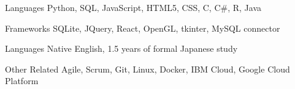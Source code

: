 

\begin{cvskills}

  \cvskill
    {Languages} %
    {Python, SQL, JavaScript, HTML5, CSS, C, C\#, R, Java} %

  \cvskill
    {Frameworks} %
    {SQLite, JQuery, React, OpenGL, tkinter, MySQL connector} %

  \cvskill
    {Languages} %
    {Native English, 1.5 years of formal Japanese study} %

  \cvskill
    {Other Related} %
    {Agile, Scrum, Git, Linux, Docker, IBM Cloud, Google Cloud Platform} %

\end{cvskills}
